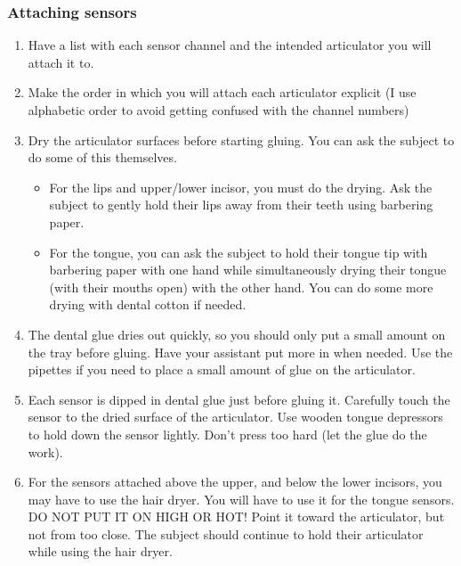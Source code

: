 \documentclass[12pt]{article}
\begin{document}
    \subsubsection{Attaching sensors}
    \begin{enumerate}
        \item 	Have a list with each sensor channel and the intended articulator you will attach it to.
        
        \item Make the order in which you will attach each articulator explicit (I use alphabetic order to avoid getting confused with the channel numbers)
        
        \item Dry the articulator surfaces before starting gluing. You can ask the subject to do some of this themselves.
        
        \begin{itemize}
            \item For the lips and upper/lower incisor, you must do the drying. Ask the subject to gently hold their lips away from their teeth using barbering paper.
            \item For the tongue, you can ask the subject to hold their tongue tip with barbering paper with one hand while simultaneously drying their tongue (with their mouths open) with the other hand. You can do some more drying with dental cotton if needed.
        \end{itemize}
        
        \item The dental glue dries out quickly, so you should only put a small amount on the tray before gluing. Have your assistant put more in when needed. Use the pipettes if you need to place a small amount of glue on the articulator.
        
        \item Each sensor is dipped in dental glue just before gluing it. Carefully touch the sensor to the dried surface of the articulator. Use wooden tongue depressors to hold down the sensor lightly. Don’t press too hard (let the glue do the work).
        
        \item For the sensors attached above the upper, and below the lower incisors, you may have to use the hair dryer. You will have to use it for the tongue sensors. DO NOT PUT IT ON HIGH OR HOT! Point it toward the articulator, but not from too close. The subject should continue to hold their articulator while using the hair dryer.
        

\end{enumerate}
\end{document}
